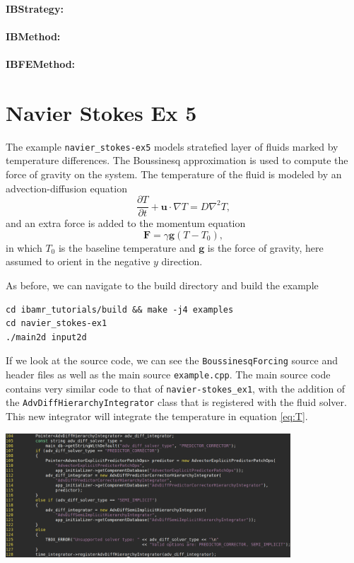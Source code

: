 \documentclass{article}
\newcommand{\bF}{\mathbf{F}}
\newcommand{\bg}{\mathbf{g}}
\newcommand{\bu}{\mathbf{u}}
\newcommand{\grad}{\nabla}
\newcommand{\Lap}{\nabla^2}
\newcommand{\parens}[1]{\mathopen{}\left(#1\right)\mathclose{}}
\begin{document}
\paragraph{IBStrategy:}

\paragraph{IBMethod:}

\paragraph{IBFEMethod:}

\section{Navier Stokes Ex 5}
The example \verb|navier_stokes-ex5| models stratefied layer of fluids marked by temperature differences. The Boussinesq approximation is used to compute the force of gravity on the system. The temperature of the fluid is modeled by an advection-diffusion equation
\begin{equation}\label{eq:T}
\frac{\partial T}{\partial t} + \bu\cdot\grad T = D\Lap T,
\end{equation}
and an extra force is added to the momentum equation
\begin{equation}\label{eq:F}
\bF = \gamma\bg\parens{T - T_0},
\end{equation}
in which $T_0$ is the baseline temperature and $\bg$ is the force of gravity, here assumed to orient in the negative $y$ direction.

As before, we can navigate to the build directory and build the example
\begin{verbatim}
cd ibamr_tutorials/build && make -j4 examples
cd navier_stokes-ex1
./main2d input2d
\end{verbatim}
If we look at the source code, we can see the \verb|BoussinesqForcing| source and header files as well as the main source \verb|example.cpp|. The main source code contains very similar code to that of \verb|navier-stokes_ex1|, with the addition of the \verb|AdvDiffHierarchyIntegrator| class that is registered with the fluid solver. This new integrator will integrate the temperature in equation \eqref{eq:T}.
\begin{center}
\includegraphics[width=0.8\textwidth]{Graphs/NS-ex5/source_AdvDiffIntegrator.png}
\end{center}
\end{document}
